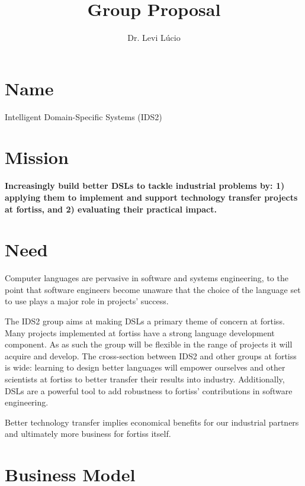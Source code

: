 \documentclass{article}
\begin{document}
\title{Group Proposal}

\author{Dr. Levi L\'ucio}

\maketitle


\section{Name}

Intelligent Domain-Specific Systems (IDS2)

\section{Mission}

\textbf{Increasingly build better DSLs to tackle industrial problems by:
1) applying them to implement and support technology transfer projects at
fortiss, and 2) evaluating their practical impact.}

\section{Need}

Computer languages are pervasive in software and systems engineering, to the
point that software engineers become unaware that the choice of the language set
to use plays a major role in projects' success. 

The IDS2 group aims at making DSLs a primary theme of concern at fortiss. Many
projects implemented at fortiss have a strong language development component. As
as such the group will be flexible in the range of projects it will acquire and
develop. The cross-section between IDS2 and other groups at fortiss is wide:
learning to design better languages will empower ourselves and other scientists
at fortiss to better transfer their results into industry. Additionally, DSLs
are a powerful tool to add robustness to fortiss' contributions in software
engineering.

Better technology transfer implies economical benefits for our industrial
partners and ultimately more business for fortiss itself.

\section{Business Model}
\end{document}
